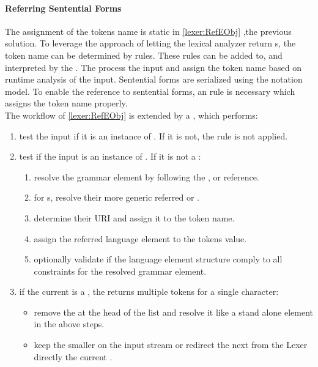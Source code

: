 \paragraph{Referring Sentential Forms}
The assignment of the tokens name is  static in \ref{lexer:RefEObj} ,the previous solution. To leverage the approach of letting the lexical analyzer return s, the token name can be determined by rules. These rules can be added to, and interpreted by the . The  process the input  and assign the token name based on runtime analysis of the input. Sentential forms are serialized using the notation model. To enable the reference to sentential forms, an  rule is necessary which assigns the token name properly. \\
The workflow of \ref{lexer:RefEObj} is extended by a , which performs:
\begin{enumerate}
	\item test the input  if it is an instance of . If it is not, the rule is not applied.
	\item test if the input is an instance of . 
	If it is not a :
	\begin{enumerate}
		\item resolve the grammar element by following the ,  or  reference. 
		\item for s, resolve their more generic referred  or .
		\item determine their URI and assign it to the token name.
		\item assign the referred language element  to the tokens value.
		\item optionally validate if the language element structure comply to all constraints for the resolved grammar element.
	\end{enumerate}
	\item if the current  is a , the  returns multiple tokens for a single character:
	\begin{itemize}
		\item remove the  at the head of the list and resolve it like a stand alone element in the above steps.
		\item keep the smaller  on the input stream or redirect the next  from the Lexer directly the current .  
	\end{itemize}
\end{enumerate}

